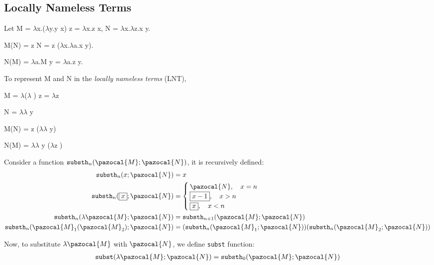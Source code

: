 \documentclass{article}
\theoremstyle{definition}
\newcommand{\lb}{$\lambda$}
\begin{document}
\subsection{Locally Nameless Terms}

Let M = \lb x.(\lb y.y x) z = \lb x.z x, N = \lb x.\lb z.x y.

M(N) = z N = z (\lb x.\lb a.x y).

N(M) = \lb a.M y = \lb a.z y.

To represent M and N in the \emph{locally nameless terms} (LNT),
\begin{tcolorbox}
    M = \lb (\lb {} ) z = \lb z 

    N = \lb \lb {} y

    M(N) = z (\lb \lb {} y)

    N(M) = \lb \lb {} y (\lb z )
\end{tcolorbox}

Consider a function $\mathtt{substh}_n(\pazocal{M};\pazocal{N})$, it is recursively defined:
\begin{align*}
    \mathtt{substh}_n(x;\pazocal{N})                            & = x                                                                                            \\
    \mathtt{substh}_n(\fbox{$x$};\pazocal{N})                   & = \begin{cases}
                                                                        \pazocal{N},\quad x = n  \\
                                                                        \fbox{$x-1$},\quad x > n \\
                                                                        \fbox{$x$},\quad x < n
                                                                    \end{cases}                                                                     \\
    \mathtt{substh}_n(\lambda \pazocal{M};\pazocal{N})          & = \mathtt{substh}_{n+1}(\pazocal{M};\pazocal{N})                                               \\
    \mathtt{substh}_n(\pazocal{M}_1(\pazocal{M}_2);\pazocal{N}) & = (\mathtt{substh}_n(\pazocal{M}_1;\pazocal{N}))(\mathtt{substh}_n(\pazocal{M}_2;\pazocal{N}))
\end{align*}

Now, to substitute $\lambda \pazocal{M}$ with $\pazocal{N}$, we define \texttt{subst} function:
\begin{align*}
    \mathtt{subst}(\lambda\pazocal{M};\pazocal{N}) = \mathtt{substh}_0(\pazocal{M};\pazocal{N})
\end{align*}
\end{document}

